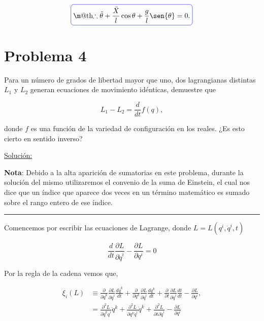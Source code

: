 \documentclass[a4paper,10pt]{article}
\makeatletter
\numberwithin{equation}{section}
\newcommand*{\boxcolor}{blue}
\renewcommand{\boxed}[1]{\textcolor{\boxcolor}{%
\tikz[baseline={([yshift=-1ex]current bounding box.center)}] \node [rectangle, minimum width=1ex,rounded corners,draw] {\normalcolor\m@th$\displaystyle#1$};}}
\makeatother
\begin{document}
\begin{equation}
 \boxed{\therefore \ddot{\theta}  + \frac{\ddot{X}}{l}\cos{\theta} + \frac{g}{l}\sen{\theta} = 0.}
\end{equation}



\section{Problema 4}

Para un número de grados de libertad mayor que uno, dos lagrangianas distintas $L_1$
y $L_2$ generan ecuaciones de movimiento idénticas, demuestre que 

$$
L_1 - L_2 = \frac{d}{dt}f(q),
$$

donde $f$ es una función de la variedad de configuración en los reales. ¿Es esto cierto 
en sentido inverso?

\vspace{.3cm}

\underline{Solución:} \vspace{.3cm}

\textbf{Nota}: Debido a la alta aparición de sumatorias en este problema, durante la
solución del mismo utilizaremos el convenio de la suma de Einstein, el cual nos dice 
que un índice que aparece dos veces en un término matemático es sumado sobre 
el rango entero de ese índice.

\noindent\rule[0.5ex]{\linewidth}{1pt}

Comencemos por escribir las ecuaciones de Lagrange, donde $L = L(q^i,\dot{q}^i,t)$

\begin{equation}
 \frac{d}{dt}\frac{\partial L}{\partial \dot{q}^i} - \frac{\partial L}{\partial q^i} = 0 
\end{equation}

Por la regla de la cadena vemos que, 

\begin{align*}
 \xi_i (L) &\equiv \frac{\partial}{\partial \dot{q}^k}\frac{\partial L}{\partial \dot{q}^i} 
 \frac{d\dot{q}^k}{dt} + \frac{\partial}{\partial q^k}\frac{\partial L}{\partial \dot{q}^i} 
 \frac{dq^k}{dt} + \frac{\partial}{\partial t}\frac{\partial L}{\partial \dot{q}^i} \frac{dt}{dt}
 - \frac{\partial L}{\partial q^i}, \\
 &= \frac{\partial^2 L}{\partial \dot{q}^k\dot{q}^i} \ddot{q}^k + 
 \frac{\partial^2 L}{\partial q^k \dot{q}^i} \dot{q}^k+ \frac{\partial^2 L}{\partial t \partial \dot{q}^i}
 - \frac{\partial L}{\partial q^i}
 \end{align*}
\end{document}
